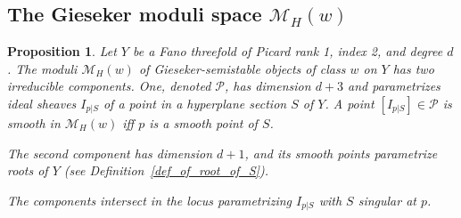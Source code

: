 \documentclass[11pt]{amsart}
\newtheorem{proposition}[thm]{Proposition}
\theoremstyle{definition}
\DeclareMathOperator{\Pic}{Pic\,}
\newcommand{\sM}{\mathcal{M}}
\newcommand{\AAA}[1]{\textcolor{red}{#1}}
\newcommand{\Ku}{\mathsf{Ku}}
\begin{document}







\subsection{The Gieseker moduli space $\sM_H(w)$}\label{sec_Gieseker_moduli}

\begin{proposition}\label{gieseker}
Let $Y$ be a Fano threefold of Picard rank 1, index 2, and degree $d$. 
The moduli $\sM_H(w)$ of Gieseker-semistable objects of class $w$ on $Y$ has two irreducible components. One, denoted $\mathcal{P}$, has dimension $d+3$ and parametrizes ideal sheaves  $I_{p|S}$ of a point in a hyperplane section $S$ of $Y$. A point $[I_{p|S}]\in \mathcal P$ is smooth in $\sM_H(w)$ iff $p$ is a smooth point of $S$.

The second component has dimension $d+1$, and its smooth points parametrize roots of $Y$ (see Definition~\ref{def_of_root_of_S}).

The components intersect in the locus parametrizing $I_{p|S}$ with $S$ singular at $p$.
\end{proposition}
\end{document}
